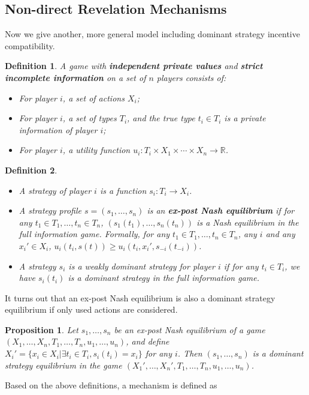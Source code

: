 \documentclass[openany]{book}
\newtheorem{definition}{Definition}[chapter]
\newtheorem{proposition}{Proposition}[chapter]
\theoremstyle{remark}
\begin{document}
\subsection{Non-direct Revelation Mechanisms}
Now we give another, more general model including dominant strategy incentive compatibility.
\begin{definition}
    A game with \textbf{independent private values} and \textbf{strict incomplete information} on a set of $n$ players consists of:
    \begin{itemize}
        \item For player $i$, a set of actions $X_i$;
        \item For player $i$, a set of types $T_i$, and the true type $t_i\in T_i$ is a private information of player $i$;
        \item For player $i$, a utility function $u_i:T_i\times X_1\times\cdots\times X_n\to \mathbb{R}$.
    \end{itemize}
\end{definition}
\begin{definition}$\ $
    \begin{itemize}
        \item A strategy of player $i$ is a function $s_i:T_i\to X_i$.
        \item A strategy profile $s=(s_1,\ldots,s_n)$ is an \textbf{ex-post Nash equilibrium} if for any $t_1\in T_1,\ldots,t_n\in T_n$, $(s_1(t_1),\ldots,s_n(t_n))$ is a Nash equilibrium in the full information game. Formally, for any $t_1\in T_1,\ldots,t_n\in T_n$, any $i$ and any $x_i'\in X_i$, $u_i(t_i,s(t))\ge u_i(t_i,x_i',s_{-i}(t_{-i}))$.
        \item A strategy $s_i$ is a weakly dominant strategy for player $i$ if for any $t_i\in T_i$, we have $s_i(t_i)$ is a dominant strategy in the full information game.
    \end{itemize}
\end{definition}
It turns out that an ex-post Nash equilibrium is also a dominant strategy equilibrium if only used actions are considered.
\begin{proposition}
    Let $s_1,\ldots,s_n$ be an ex-post Nash equilibrium of a game $(X_1,\ldots,X_n,T_1,\ldots,T_n,u_1,\ldots,u_n)$, and define $X_i'=\{x_i\in X_i|\exists t_i\in T_i,s_i(t_i)=x_i\}$ for any $i$. Then $(s_1,\ldots,s_n)$ is a dominant strategy equilibrium in the game $(X_1',\ldots,X_n',T_1,\ldots,T_n,u_1,\ldots,u_n)$.
\end{proposition}
Based on the above definitions, a mechanism is defined as
\end{document}
